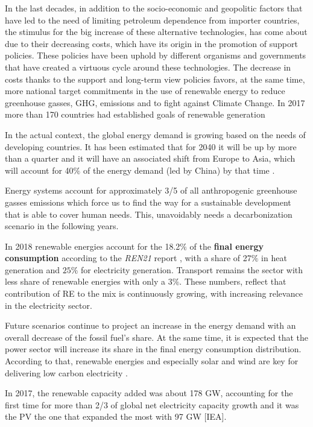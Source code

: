 In the last decades, in addition to the socio-economic and geopolitic factors that have led to the need of limiting petroleum dependence from importer countries, the stimulus for the big increase of these alternative technologies, has come about due to their decreasing costs, which have its origin in the promotion of support policies. These policies have been uphold by different organisms and governments that have created a virtuous cycle around these technologies. The decrease in costs thanks to the support and long-term view policies favors, at the same time, more national target commitments in the use of renewable energy to reduce greenhouse gasses, GHG, emissions and to fight against Climate Change. In 2017 more than 170 countries had established goals of renewable generation \cite*{IRENA2017}
 
In the actual context, the global energy demand is growing based on the needs of developing countries. It has been estimated that for 2040 it will be up by more than a quarter and it will have an associated shift from Europe to Asia, which will account for 40$\%$ of the energy demand (led by China) by that time \cite*{WEO2018}.

Energy systems account for approximately 3/5 of all anthropogenic greenhouse gasses emissions \cite*{WEO2018} which force us to find the way for a sustainable development that is able to cover human needs. This, unavoidably needs a decarbonization scenario in the following years.  

In 2018 renewable energies account for the 18.2$\%$ of the \textbf{final energy consumption} according to the \textit{REN21} report \cite*{REN21}, with a share of 27$\%$ in heat generation and $25\%$ for electricity generation. Transport remains the sector with less share of renewable energies with only a $3\%$. These numbers, reflect that contribution of RE to the mix is continuously growing, with increasing relevance in the electricity sector.

Future scenarios continue to project an increase in the energy demand with an overall decrease of the fossil fuel's share. At the same time, it is expected that the power sector will increase its share in the final energy consumption distribution. According to that, renewable energies and especially solar and wind are key for delivering low carbon electricity \cite*{Troccoli2018}.

In 2017, the renewable capacity added was about 178 GW, accounting for the first time for more than 2/3 of global net electricity capacity growth and it was the PV the one that expanded the most with 97 GW [IEA].

